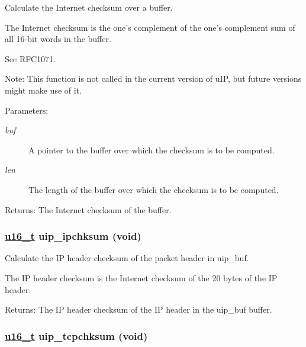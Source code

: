 Calculate the Internet checksum over a buffer. 

The Internet checksum is the one's complement of the one's complement sum of all 16-bit words in the buffer.

See RFC1071.

\begin{Desc}
\item[Note:]This function is not called in the current version of u\-IP, but future versions might make use of it.\end{Desc}
\begin{Desc}
\item[Parameters:]
\begin{description}
\item[{\em buf}]A pointer to the buffer over which the checksum is to be computed.\item[{\em len}]The length of the buffer over which the checksum is to be computed.\end{description}
\end{Desc}
\begin{Desc}
\item[Returns:]The Internet checksum of the buffer. \end{Desc}
\hypertarget{a00066_g2addf34c7d457c1a7899a7e2171ef1e9}{
\subsubsection[uip\_\-ipchksum]{\setlength{\rightskip}{0pt plus 5cm}\hyperlink{a00070_gfc6499c1f28697aa3bfc2804d496fd11}{u16\_\-t} uip\_\-ipchksum (void)}}
\label{a00066_g2addf34c7d457c1a7899a7e2171ef1e9}


Calculate the IP header checksum of the packet header in uip\_\-buf. 

The IP header checksum is the Internet checksum of the 20 bytes of the IP header.

\begin{Desc}
\item[Returns:]The IP header checksum of the IP header in the uip\_\-buf buffer. \end{Desc}
\hypertarget{a00066_g85b65e38aa74eba18979156f97a94a87}{
\subsubsection[uip\_\-tcpchksum]{\setlength{\rightskip}{0pt plus 5cm}\hyperlink{a00070_gfc6499c1f28697aa3bfc2804d496fd11}{u16\_\-t} uip\_\-tcpchksum (void)}}
\label{a00066_g85b65e38aa74eba18979156f97a94a87}



